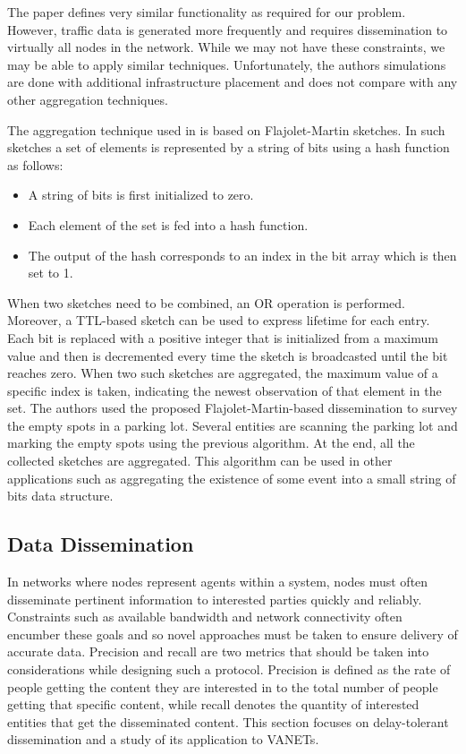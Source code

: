 \documentclass{IEEEtran}
\begin{document}
The \cite{landmark} paper defines very similar functionality as required for our problem. However, traffic data is generated more frequently and requires dissemination to virtually all nodes in the network. While we may not have these constraints, we may be able to apply similar techniques. Unfortunately, the authors simulations are done with additional infrastructure placement and does not compare with any other aggregation techniques.

The aggregation technique used in \cite{prob_agg} is based on Flajolet-Martin sketches. In such sketches a set of elements is represented by a string of bits using a hash function as follows:

\begin{itemize}
\item A string of bits is first initialized to zero.
\item Each element of the set is fed into a hash function.
\item The output of the hash corresponds to an index in the bit array which is then set to 1.
\end{itemize}

When two sketches need to be combined, an OR operation is performed. Moreover, a TTL-based sketch can be used to express lifetime for each entry. Each bit is replaced with a positive integer that is initialized from a maximum value and then is decremented every time the sketch is broadcasted until the bit reaches zero. When two such sketches are aggregated, the maximum value of a specific index is taken, indicating the newest observation of that element in the set. The authors used the proposed Flajolet-Martin-based dissemination to survey the empty spots in a parking lot. Several entities are scanning the parking lot and marking the empty spots using the previous algorithm. At the end, all the collected sketches are aggregated. This algorithm can be used in other applications such as aggregating the existence of some event into a small string of bits data structure.

\subsection{Data Dissemination}

In networks where nodes represent agents within a system, nodes must often disseminate pertinent information to interested parties quickly and reliably.  Constraints such as available bandwidth and network connectivity often encumber these goals and so novel approaches must be taken to ensure delivery of accurate data.   Precision and recall are two metrics that should be taken into considerations while designing such a protocol. Precision is defined as the rate of people getting the content they are interested in to the total number of people getting that specific content, while recall denotes the quantity of interested entities that get the disseminated content.  This section focuses on delay-tolerant dissemination and a study of its application to VANETs.
\end{document}
